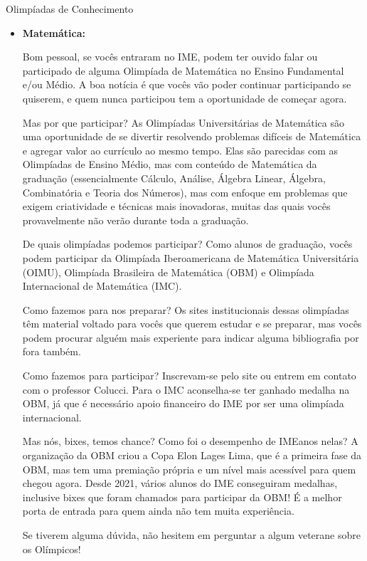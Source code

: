 \begin{subsecao}{Olimpíadas de Conhecimento}

\begin{itemize}

\item{\bf Matemática: }

Bom pessoal, se vocês entraram no IME, podem ter ouvido falar ou participado
de alguma Olimpíada de Matemática no Ensino Fundamental e/ou Médio. A
boa notícia é que vocês vão poder continuar participando se quiserem,
e quem nunca participou tem a oportunidade de começar agora.

Mas por que participar? As Olimpíadas Universitárias de Matemática são uma
oportunidade de se divertir resolvendo problemas difíceis de Matemática e agregar
valor ao currículo ao mesmo tempo. Elas são parecidas com as Olimpíadas de
Ensino Médio, mas com conteúdo de Matemática da graduação (essencialmente
Cálculo, Análise, Álgebra Linear, Álgebra, Combinatória e Teoria dos Números),
mas com enfoque em problemas que exigem criatividade e técnicas mais inovadoras,
muitas das quais vocês provavelmente não verão durante toda a graduação.

De quais olimpíadas podemos participar? Como alunos de graduação, vocês podem
participar da Olimpíada Iberoamericana de Matemática Universitária (OIMU),
Olimpíada Brasileira de Matemática (OBM) e Olimpíada Internacional de
Matemática (IMC).

Como fazemos para nos preparar? Os sites institucionais dessas olimpíadas
têm material voltado para vocês que querem estudar e se preparar, mas vocês
podem procurar alguém mais experiente para indicar alguma bibliografia por fora
também. 

Como fazemos para participar? Inscrevam-se pelo site ou entrem em contato com
o professor Colucci. Para o IMC aconselha-se ter ganhado medalha na OBM,
já que é necessário apoio financeiro do IME por ser uma olimpíada internacional.

Mas nós, bixes, temos chance? Como foi o desempenho de IMEanos nelas? A organização 
da OBM criou a Copa Elon Lages Lima, que é a primeira fase da OBM, mas tem uma 
premiação própria e um nível mais acessível para quem chegou agora. Desde 2021, 
vários alunos do IME conseguiram medalhas, inclusive bixes que foram chamados para participar 
da OBM! É a melhor porta de entrada para quem ainda não tem muita experiência. 

Se tiverem alguma dúvida, não hesitem em perguntar a algum veterane sobre os
Olímpicos!


\end{itemize}
\end{subsecao}
